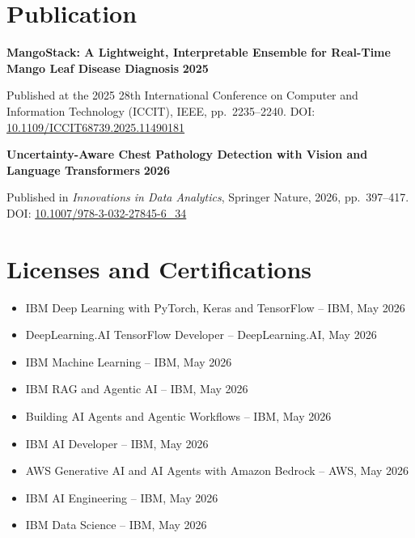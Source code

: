﻿\documentclass[10pt,a4paper]{article}
\begin{document}
\section{Publication}

\textbf{MangoStack: A Lightweight, Interpretable Ensemble for Real-Time Mango Leaf Disease Diagnosis}
\hfill
\textbf{2025}

Published at the 2025 28th International Conference on Computer and Information Technology (ICCIT), IEEE, pp.~2235--2240. DOI: \href{https://doi.org/10.1109/ICCIT68739.2025.11490181}{10.1109/ICCIT68739.2025.11490181}

\vspace{2mm}

\textbf{Uncertainty-Aware Chest Pathology Detection with Vision and Language Transformers}
\hfill
\textbf{2026}

Published in \textit{Innovations in Data Analytics}, Springer Nature, 2026, pp.~397--417. DOI: \href{https://doi.org/10.1007/978-3-032-27845-6_34}{10.1007/978-3-032-27845-6\_34}


\section{Licenses and Certifications}

\begin{itemize}

\item IBM Deep Learning with PyTorch, Keras and TensorFlow -- IBM, May 2026

\item DeepLearning.AI TensorFlow Developer -- DeepLearning.AI, May 2026

\item IBM Machine Learning -- IBM, May 2026

\item IBM RAG and Agentic AI -- IBM, May 2026

\item Building AI Agents and Agentic Workflows -- IBM, May 2026

\item IBM AI Developer -- IBM, May 2026

\item AWS Generative AI and AI Agents with Amazon Bedrock -- AWS, May 2026

\item IBM AI Engineering -- IBM, May 2026

\item IBM Data Science -- IBM, May 2026

\end{itemize}
\end{document}
